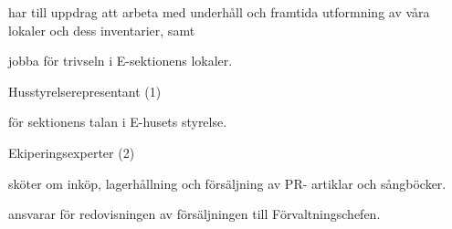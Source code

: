 \documentclass[10pt]{article}
\begin{document}
\begin{emptylist}
\begin{dashlist}
            \item har till uppdrag att arbeta med underhåll och framtida utformning  av våra lokaler och dess inventarier, samt
            \item jobba för trivseln i E-sektionens lokaler.
        \end{dashlist}
    \item Husstyrelserepresentant (1)
        \begin{dashlist}
            \item för sektionens talan i E-husets styrelse.
        \end{dashlist}
    \item Ekiperingsexperter (2)
        \begin{dashlist}
            \item sköter om inköp, lagerhållning och försäljning av PR- artiklar och sångböcker.
            \item ansvarar för redovisningen av försäljningen till Förvaltningschefen.
        \end{dashlist}
\end{emptylist}
\end{document}
